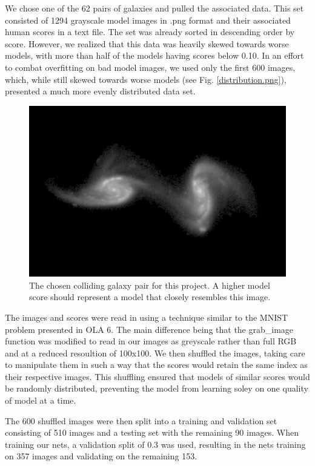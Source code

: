\documentclass[conference]{IEEEtran}
\begin{document}
We chose one of the 62 pairs of galaxies and pulled the associated data. This set consisted of 1294 grayscale model images in .png format and their associated human scores in a text file. The set was already sorted in descending order by score. However, we realized that this data was heavily skewed towards worse models, with more than half of the models having scores below 0.10. In an effort to combat overfitting on bad model images, we used only the first 600 images, which, while still skewed towards worse models (see Fig. \ref{distribution.png}), presented a much more evenly distributed data set.

\begin{figure}[htbp]
\centerline{\includegraphics[width=0.75\linewidth]{./Images/target.png}}
\caption{The chosen colliding galaxy pair for this project. A higher model score should represent a model that closely resembles this image.}
\label{fig:TargetGalaxy}
\end{figure}

The images and scores were read in using a technique similar to the MNIST problem presented in OLA 6. The main difference being that the grab\_image function was modified to read in our images as greyscale rather than full RGB and at a reduced resoultion of 100x100. We then shuffled the images, taking care to manipulate them in such a way that the scores would retain the same index as their respective images. This shuffling ensured that models of similar scores would be randomly distributed, preventing the model from learning soley on one quality of model at a time. 

The 600 shuffled images were then split into a training and validation set consisting of 510 images and a testing set with the remaining 90 images. When training our nets, a validation split of 0.3 was used, resulting in the nets training on 357 images and validating on the remaining 153.
\end{document}
